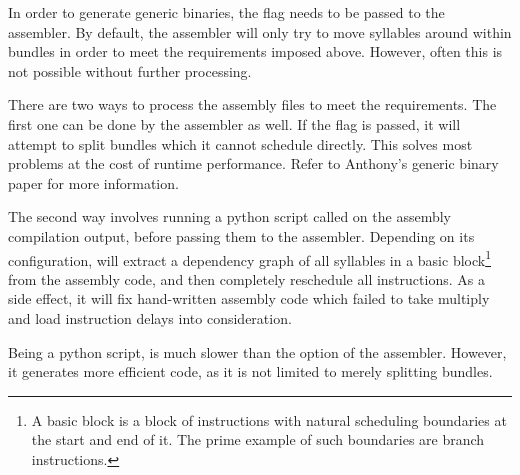 In order to generate generic binaries, the  flag needs to be passed to
the assembler. By default, the assembler will only try to move syllables around
within bundles in order to meet the requirements imposed above. However, often
this is not possible without further processing.

There are two ways to process the assembly files to meet the requirements. The
first one can be done by the assembler as well. If the  flag
is passed, it will attempt to split bundles which it cannot schedule directly.
This solves most problems at the cost of runtime performance. Refer to Anthony's
generic binary paper
for more information.

The second way involves running a python script called  on the 
assembly compilation output, before passing them to the assembler. Depending on 
its configuration,  will extract a dependency graph of all 
syllables in a basic block\footnote{A basic block is a block of instructions 
with natural scheduling boundaries at the start and end of it. The prime example 
of such boundaries are branch instructions.} from the assembly code, and then 
completely reschedule all instructions. As a side effect, it will fix 
hand-written assembly code which failed to take multiply and load instruction 
delays into consideration.

Being a python script,  is much slower than the 
 option of the assembler. However, it generates more efficient 
code, as it is not limited to merely splitting bundles.
